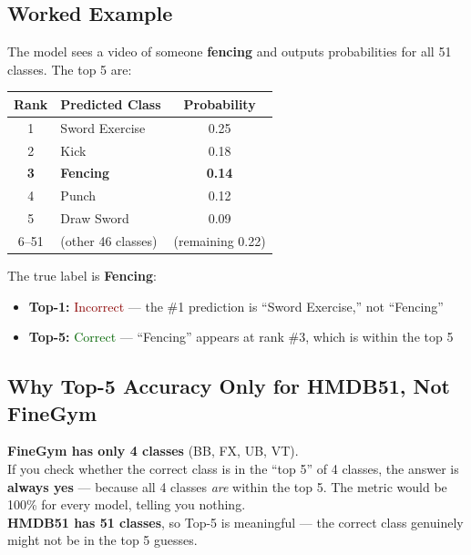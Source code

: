 \documentclass[12pt, a4paper]{article}
\begin{document}
\subsection{Worked Example}

\begin{examplebox}
The model sees a video of someone \textbf{fencing} and outputs probabilities for all 51 classes. The top 5 are:

\begin{center}
\begin{tabular}{clc}
\toprule
\textbf{Rank} & \textbf{Predicted Class} & \textbf{Probability} \\
\midrule
1 & Sword Exercise & 0.25 \\
2 & Kick & 0.18 \\
\rowcolor{lightgreen} \textbf{3} & \textbf{Fencing} & \textbf{0.14} \\
4 & Punch & 0.12 \\
5 & Draw Sword & 0.09 \\
\midrule
6--51 & (other 46 classes) & (remaining 0.22) \\
\bottomrule
\end{tabular}
\end{center}

The true label is \textbf{Fencing}:
\begin{itemize}
    \item \textbf{Top-1:} \textcolor{darkred}{ Incorrect} --- the \#1 prediction is ``Sword Exercise,'' not ``Fencing''
    \item \textbf{Top-5:} \textcolor{darkgreen}{\checkmark Correct} --- ``Fencing'' appears at rank \#3, which is within the top 5
\end{itemize}
\end{examplebox}

\subsection{Why Top-5 Accuracy Only for HMDB51, Not FineGym}

\begin{warningbox}
\textbf{FineGym has only 4 classes} (BB, FX, UB, VT).\\[0.3cm]
If you check whether the correct class is in the ``top 5'' of 4 classes, the answer is \textbf{always yes} --- because all 4 classes \textit{are} within the top 5. The metric would be 100\% for every model, telling you nothing.\\[0.3cm]
\textbf{HMDB51 has 51 classes}, so Top-5 is meaningful --- the correct class genuinely might not be in the top 5 guesses.
\end{warningbox}
\end{document}
